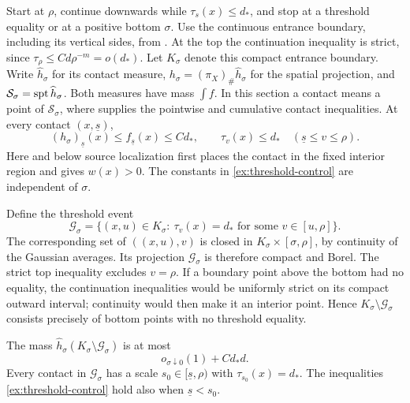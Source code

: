 Start at \(\rho\), continue downwards while \(\tau_s(x)\le d_*\),
and stop at a threshold equality or at a positive bottom \(\sigma\).
Use the continuous entrance boundary, including its vertical sides,
from . At the top the continuation inequality is
strict, since \(\tau_\rho\le Cd\rho^{-m}=o(d_*)\).
Let \(K_\sigma\) denote this compact entrance boundary. Write
\(\widehat h_\sigma\) for its contact measure,
\(h_\sigma=(\pi_X)_\#\widehat h_\sigma\) for the spatial projection,
and \(\mathcal S_\sigma=\operatorname{spt}\widehat h_\sigma\). Both measures have
mass \(\int f\). In this section a contact means a point of
\(\mathcal S_\sigma\), where  supplies the pointwise
and cumulative contact inequalities. At every contact
\((x,\underline s)\),
\begin{equation}
 (h_\sigma)_{\underline s}(x)\le f_{\underline s}(x)
 \le Cd_*,\qquad
 \tau_v(x)\le d_*\quad(\underline s\le v\le\rho).
 \label{ex:threshold-control}
\end{equation}
Here and below source localization first places the contact in the
fixed interior region and gives \(w(x)>0\). The constants in
\eqref{ex:threshold-control} are independent of \(\sigma\).

Define the threshold event
\[
 \mathcal G_\sigma=
 \{(x,u)\in K_\sigma:\ \tau_v(x)=d_*
                 \text{ for some }v\in[u,\rho]\}.
\]
The corresponding set of \(((x,u),v)\) is closed in
\(K_\sigma\times[\sigma,\rho]\), by continuity of the Gaussian
averages. Its projection \(\mathcal G_\sigma\) is therefore compact
and Borel. The strict top inequality excludes \(v=\rho\). If a
boundary point above the bottom had no equality, the continuation
inequalities would be uniformly strict on its compact outward
interval; continuity would then make it an interior point. Hence
\(K_\sigma\setminus\mathcal G_\sigma\) consists precisely of bottom
points with no threshold equality.

\begin{lemma}
\label{ex:bottom}
The mass \(\widehat h_\sigma(K_\sigma\setminus\mathcal G_\sigma)\)
is at most
\[
 o_{\sigma\downarrow0}(1)+Cd_*d.
\]
Every contact in \(\mathcal G_\sigma\) has a scale
\(s_0\in[\underline s,\rho)\) with
\(\tau_{s_0}(x)=d_*\). The inequalities
\eqref{ex:threshold-control} hold also when
\(\underline s<s_0\).
\end{lemma}

